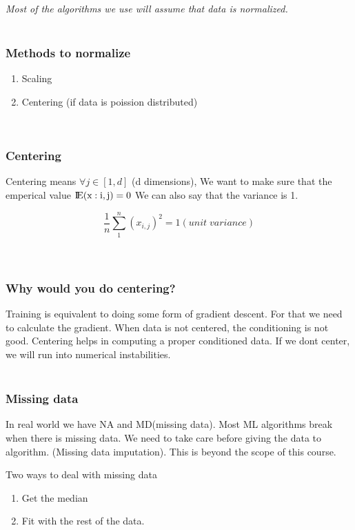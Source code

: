 \documentclass{article}
\begin{document}
\textit{Most of the algorithms we use will assume that data is normalized.}\\\\
\subsubsection*{Methods to normalize}
\begin{enumerate}
	\item Scaling
	\item Centering (if data is poission distributed)
\end{enumerate}
\
\subsubsection*{Centering} 
Centering means \( \forall j \in [1, d] \) (d dimensions), We want to make sure that the emperical value \( \rm I\!E(x:i,j) = 0 \)
We can also say that the variance is 1.

\begin{equation*}
	\frac{1}{n}\sum_{1}^{n} (x_{i,j})^2 = 1 (unit \; variance)
\end{equation*}
 \\\\
\subsubsection*{Why would you do centering?}
Training is equivalent to doing some form of gradient descent.  For that we need to calculate the gradient.  When data is not centered, the conditioning is not good.  Centering helps in computing a proper conditioned data.  If we dont center, we will run into numerical instabilities.\\\\
\subsubsection*{Missing data}
In real world we have NA and MD(missing data).  Most ML algorithms break when there is missing data.  We need to take care before giving the data to algorithm. (Missing data imputation).  This is beyond the scope of this course.

Two ways to deal with missing data
\begin{enumerate}
	\item Get the median
	\item Fit with the rest of the data.
\end{enumerate}
\end{document}
